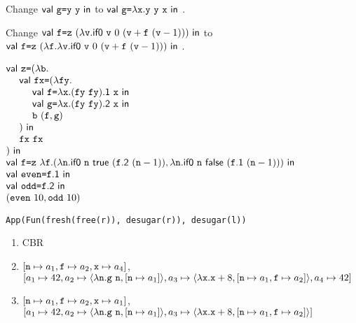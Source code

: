 \textbf{}

Change $\textsf{val}\ \texttt{g}\texttt{=}\texttt{y}\ \texttt{y}\ \textsf{in}\ $to
$\textsf{val}\ \texttt{g}\texttt{=}\lambda\texttt{x}.\texttt{y}\ \texttt{y}\ \texttt{x}\ \textsf{in}\ $\!.
\\

\textbf{}

Change $\textsf{val}\ \texttt{f}\texttt{=}\texttt{z}\ ({\lambda\texttt{v}.\textsf{if0}\ \texttt{v}\ 0\ (\texttt{v}+\texttt{f}\ (\texttt{v}-1))})\ \textsf{in}\ $to
$\textsf{val}\ \texttt{f}\texttt{=}\texttt{z}\ ({\lambda\texttt{f}.\lambda\texttt{v}.\textsf{if0}\ \texttt{v}\ 0\ (\texttt{v}+\texttt{f}\ (\texttt{v}-1))})\ \textsf{in}\ $\!.
\\

\textbf{}

$\begin{array}{@{}l@{}}
  \ebind{\cz}{(\efun{\cb}{\\
  \ \ \ \ \ebind{\code{fx}}{(\efun{\code{fy}}{\\
  \ \ \ \ \ \ \ \ \ebind{\cf}{\efun{\cx}{(\eapp{\code{fy}}{\code{fy}})\textsf{.1}\ \cx}}{\\
  \ \ \ \ \ \ \ \ \ebind{\code{g}}{\efun{\cx}{(\eapp{\code{fy}}{\code{fy}})\textsf{.2}\ \cx}}{\\
  \ \ \ \ \ \ \ \ \eapp{\cb}{(\cf,\code{g})}}}}\\\ \ \ \ )}{\\
  \ \ \ \ \eapp{\code{fx}}{\code{fx}}}}\\)}{\\
  \ebind{\cf}{\eapp{\cz}{\efun{\cf}{(
    \efun{\code{n}}{\eifz{\code{n}}{\true}{(\eapp{\cf\textsf{.2}}{(\esub{\code{n}}{1})})}},
    \efun{\code{n}}{\eifz{\code{n}}{\false}{(\eapp{\cf\textsf{.1}}{(\esub{\code{n}}{1})})}}
  )}}}{\\
  \ebind{\code{even}}{\cf\textsf{.1}}{\\
  \ebind{\code{odd}}{\cf\textsf{.2}}{\\
  (\eapp{\code{even}}{10}, \eapp{\code{odd}}{10})}}}}
\end{array}$
\\

\textbf{}
\vspace{-1em}
\begin{verbatim}
App(Fun(fresh(free(r)), desugar(r)), desugar(l))
\end{verbatim}

\textbf{}
\begin{enumerate}
  \item CBR
  \item
    $[\texttt{n} \mapsto a_1, \texttt{f} \mapsto a_2, \texttt{x} \mapsto a_4]$,\\
$[
    a_1 \mapsto 42,
    a_2 \mapsto \langle\lambda\texttt{n}.\texttt{g}\ \texttt{n},[\texttt{n} \mapsto a_1]\rangle,
    a_3 \mapsto \langle\lambda\texttt{x}.\texttt{x}+8,[\texttt{n} \mapsto a_1, \texttt{f} \mapsto a_2]\rangle,
    a_4 \mapsto 42
]$
  \item
    $[\texttt{n} \mapsto a_1, \texttt{f} \mapsto a_2, \texttt{x} \mapsto a_1]$,\\
$[
    a_1 \mapsto 42,
    a_2 \mapsto \langle\lambda\texttt{n}.\texttt{g}\ \texttt{n},[\texttt{n} \mapsto a_1]\rangle,
    a_3 \mapsto \langle\lambda\texttt{x}.\texttt{x}+8,[\texttt{n} \mapsto a_1, \texttt{f} \mapsto a_2]\rangle
]$
\end{enumerate}

